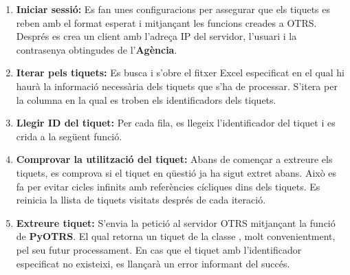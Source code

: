 \begin{enumerate}
     \item \textbf{Iniciar sessió:} Es fan unes configuracions per assegurar que els tiquets es reben amb el format esperat i mitjançant les funcions creades a OTRS. Després es crea un client amb l'adreça IP del servidor, l'usuari i la contrasenya obtingudes de l'\textbf{Agència}.
     \item \textbf{Iterar pels tiquets:} Es busca i s'obre el fitxer Excel especificat en el qual hi haurà la informació necessària dels tiquets que s'ha de processar. S'itera per la columna en la qual es troben els identificadors dels tiquets.
     \item \textbf{Llegir ID del tiquet:} Per cada fila, es llegeix l'identificador del tiquet i es crida a la següent funció.
     \item \textbf{Comprovar la utilització del tiquet:} Abans de començar a extreure els tiquets, es comprova si el tiquet en qüestió ja ha sigut extret abans. Això es fa per evitar cicles infinits amb referències cícliques dins dels tiquets. Es reinicia la llista de tiquets visitats després de cada iteració.
     \item \textbf{Extreure tiquet:} S'envia la petició al servidor OTRS mitjançant la funció \linebreak {} de \textbf{PyOTRS}. El qual retorna un tiquet de la classe , molt convenientment, pel seu futur processament. En cas que el tiquet amb l'identificador especificat no existeixi, es llançarà un error informant del succés.
\end{enumerate}


